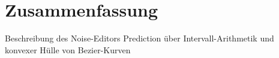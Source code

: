 \chapter{Zusammenfassung}
Beschreibung des Noise-Editors
Prediction über Intervall-Arithmetik und konvexer Hülle von Bezier-Kurven
